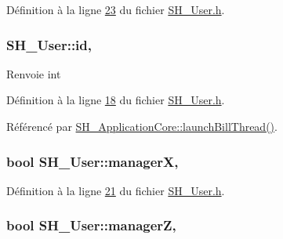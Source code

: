 Définition à la ligne \hyperlink{SH__User_8h_source_l00023}{23} du fichier \hyperlink{SH__User_8h_source}{S\-H\-\_\-\-User.\-h}.

\hypertarget{classSH__User_a187ee34e1d6d3466f3852e091cdb69e9}{
\subsubsection[{id}]{\setlength{\rightskip}{0pt plus 5cm}S\-H\-\_\-\-User\-::id\hspace{0.3cm}{\ttfamily [read]}, {\ttfamily [inherited]}}}\label{classSH__User_a187ee34e1d6d3466f3852e091cdb69e9}
\begin{DoxyReturn}{Renvoie}
int 
\end{DoxyReturn}


Définition à la ligne \hyperlink{SH__User_8h_source_l00018}{18} du fichier \hyperlink{SH__User_8h_source}{S\-H\-\_\-\-User.\-h}.



Référencé par \hyperlink{classSH__ApplicationCore_ab72fd6cdc47575d47157fc7bdffae8f2}{S\-H\-\_\-\-Application\-Core\-::launch\-Bill\-Thread()}.

\hypertarget{classSH__User_a1794a1229076bcaf2de708146db574b3}{
\subsubsection[{manager\-X}]{\setlength{\rightskip}{0pt plus 5cm}bool S\-H\-\_\-\-User\-::manager\-X\hspace{0.3cm}{\ttfamily [read]}, {\ttfamily [inherited]}}}\label{classSH__User_a1794a1229076bcaf2de708146db574b3}


Définition à la ligne \hyperlink{SH__User_8h_source_l00021}{21} du fichier \hyperlink{SH__User_8h_source}{S\-H\-\_\-\-User.\-h}.

\hypertarget{classSH__User_ad5e987610bea0bd50bbc0a1d1ac0aed5}{
\subsubsection[{manager\-Z}]{\setlength{\rightskip}{0pt plus 5cm}bool S\-H\-\_\-\-User\-::manager\-Z\hspace{0.3cm}{\ttfamily [read]}, {\ttfamily [inherited]}}}\label{classSH__User_ad5e987610bea0bd50bbc0a1d1ac0aed5}


